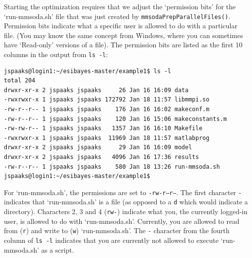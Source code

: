 


Starting the optimization requires that we adjust the `permission bits' for the `run-mmsoda.sh' file that was just created by \texttt{mmsodaPrepParallelFiles()}. Permission bits indicate what a specific user is allowed to do with a particular file. (You may know the same concept from Windows, where you can sometimes have `Read-only' versions of a file). The permission bits are listed as the first 10 columns in the output from \texttt{ls -l}:


\begin{lstlisting}[style=basic,style=bash]
jspaaks@login1:~/esibayes-master/example1$ ls -l
total 204
drwxr-xr-x 2 jspaaks jspaaks     26 Jan 16 16:09 data
-rwxrwxr-x 1 jspaaks jspaaks 172792 Jan 18 11:57 libmmpi.so
-rw-r--r-- 1 jspaaks jspaaks    176 Jan 16 16:02 makeconf.m
-rw-r--r-- 1 jspaaks jspaaks    120 Jan 16 15:06 makeconstants.m
-rw-rw-r-- 1 jspaaks jspaaks   1357 Jan 16 16:10 Makefile
-rwxrwxr-x 1 jspaaks jspaaks  11969 Jan 18 11:57 matlabprog
drwxr-xr-x 2 jspaaks jspaaks     29 Jan 16 16:09 model
drwxr-xr-x 2 jspaaks jspaaks   4096 Jan 16 17:36 results
-rw-r--r-- 1 jspaaks jspaaks    580 Jan 18 13:26 run-mmsoda.sh
jspaaks@login1:~/esibayes-master/example1$
\end{lstlisting}

For `run-mmsoda.sh', the permissions are set to \texttt{-rw-r--r--}. The first character \texttt{-} indicates that `run-mmsoda.sh' is a file (as opposed to a \texttt{d} which would indicate a directory). Characters 2, 3 and 4 (\texttt{rw-}) indicate what you, the currently logged-in user, is allowed to do with `run-mmsoda.sh'. Currently, you are allowed to read from (\texttt{r}) and write to (\texttt{w}) `run-mmsoda.sh'. The \texttt{-} character from the fourth column of \texttt{ls -l} indicates that you are currently not allowed to execute `run-mmsoda.sh' as a script.

